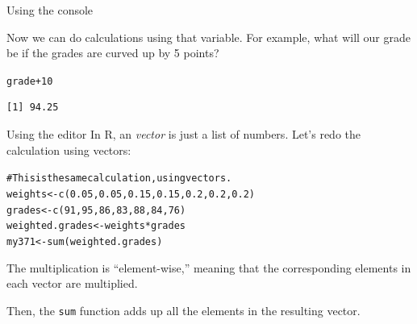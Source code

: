 \documentclass{beamer}\usepackage[]{graphicx}\usepackage[]{color}
\makeatletter
\newcommand{\hlnum}[1]{\textcolor[rgb]{0.824,0.412,0.118}{#1}}%
\newcommand{\hlcom}[1]{\textcolor[rgb]{0.824,0.706,0.549}{#1}}%
\newcommand{\hlopt}[1]{\textcolor[rgb]{1,0.894,0.769}{#1}}%
\newcommand{\hlstd}[1]{\textcolor[rgb]{1,0.894,0.769}{#1}}%
\newcommand{\hlkwb}[1]{\textcolor[rgb]{0.804,0.776,0.451}{#1}}%
\newcommand{\hlkwd}[1]{\textcolor[rgb]{1,0.78,0.769}{#1}}%
\newenvironment{kframe}{%
 \def\at@end@of@kframe{}%
 \ifinner\ifhmode%
  \def\at@end@of@kframe{\end{minipage}}%
  \begin{minipage}{\columnwidth}%
 \fi\fi%
 \def\FrameCommand##1{\hskip\@totalleftmargin \hskip-\fboxsep
 \colorbox{shadecolor}{##1}\hskip-\fboxsep
     \hskip-\linewidth \hskip-\@totalleftmargin \hskip\columnwidth}%
 \MakeFramed {\advance\hsize-\width
   \@totalleftmargin\z@ \linewidth\hsize
   \@setminipage}}%
 {\par\unskip\endMakeFramed%
 \at@end@of@kframe}
\newenvironment{knitrout}{}{} %
\makeatother
\begin{document}
\begin{darkframes}
\begin{frame}[fragile]{Using the console}
      \pause

      Now we can do calculations using that variable. For example,
      what will our grade be if the grades are curved up by 5 points?

\begin{knitrout}
\begin{kframe}
\begin{alltt}
\hlstd{grade} \hlopt{+} \hlnum{10}
\end{alltt}
\begin{verbatim}
[1] 94.25
\end{verbatim}
\end{kframe}
\end{knitrout}
    \end{frame}

    \begin{frame}[fragile]{Using the editor}
      In R, an \emph{vector} is just a list of numbers.
      Let's redo the calculation using vectors:

\begin{knitrout}
\begin{kframe}
\begin{alltt}
\hlcom{# This is the same calculation, using vectors.}
\hlstd{weights} \hlkwb{<-} \hlkwd{c}\hlstd{(}\hlnum{0.05}\hlstd{,} \hlnum{0.05}\hlstd{,} \hlnum{0.15}\hlstd{,} \hlnum{0.15}\hlstd{,} \hlnum{0.2}\hlstd{,} \hlnum{0.2}\hlstd{,} \hlnum{0.2}\hlstd{)}
\hlstd{grades} \hlkwb{<-} \hlkwd{c}\hlstd{(}\hlnum{91}\hlstd{,} \hlnum{95}\hlstd{,} \hlnum{86}\hlstd{,} \hlnum{83}\hlstd{,} \hlnum{88}\hlstd{,} \hlnum{84}\hlstd{,} \hlnum{76}\hlstd{)}
\hlstd{weighted.grades} \hlkwb{<-} \hlstd{weights} \hlopt{*} \hlstd{grades}
\hlstd{my371} \hlkwb{<-} \hlkwd{sum}\hlstd{(weighted.grades)}
\end{alltt}
\end{kframe}
\end{knitrout}
      The multiplication is ``element-wise,'' meaning that the corresponding elements in each vector are multiplied. \pause

      Then, the \verb|sum| function adds up all the elements in the resulting vector.


    \end{frame}




\end{darkframes}
\end{document}
